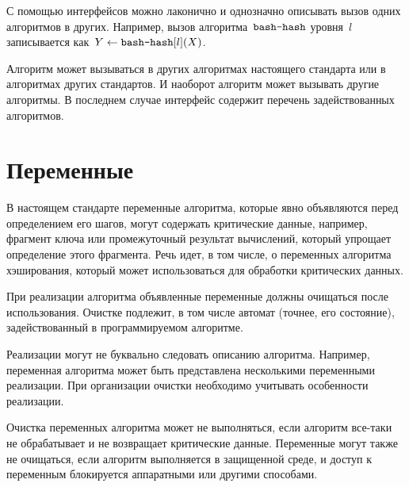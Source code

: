 С помощью интерфейсов можно лаконично и однозначно 
описывать вызов одних алгоритмов в других.
%        	
Например, вызов алгоритма~$\texttt{bash-hash}$ уровня~$l$
записывается как~$Y\leftarrow\texttt{bash-hash}[l](X)$.

Алгоритм может вызываться в других алгоритмах настоящего стандарта или 
в алгоритмах других стандартов. И наоборот алгоритм может вызывать другие 
алгоритмы. В последнем случае интерфейс содержит перечень задействованных 
алгоритмов.

\section{Переменные}\label{COMMON.Vars}

В настоящем стандарте переменные алгоритма, которые явно объявляются перед 
определением его шагов, могут содержать критические данные, например, фрагмент 
ключа или промежуточный результат вычислений, который упрощает определение 
этого фрагмента.
%
Речь идет, в том числе, о переменных алгоритма хэширования, 
который может использоваться для обработки критических данных.

При реализации алгоритма объявленные переменные должны очищаться после 
использования.
%
Очистке подлежит, в том числе автомат (точнее, его состояние), 
задействованный в программируемом алгоритме.

Реализации могут не буквально следовать описанию алгоритма.
Например, переменная алгоритма может быть представлена несколькими 
переменными реализации. При организации очистки необходимо учитывать 
особенности реализации.

Очистка переменных алгоритма может не выполняться, если алгоритм все-таки 
не обрабатывает и не возвращает критические данные.
%
Переменные могут также не очищаться, если алгоритм выполняется в защищенной 
среде, и доступ к переменным блокируется аппаратными или другими способами.


